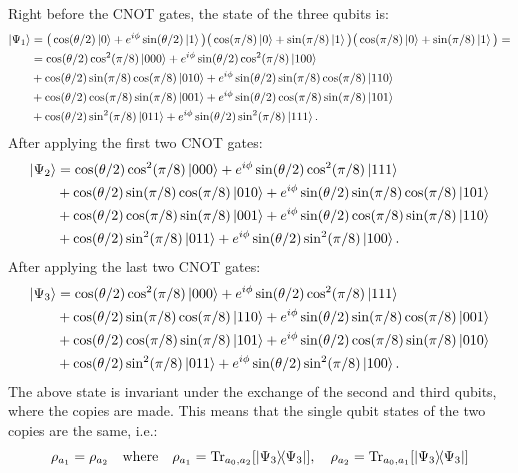 Right before the CNOT gates, the state of the three qubits is:
\[
    \begin{split}
    \ket{\Psi_1}&=\big(\cos(\theta/2)\ket{0}+e^{i\phi}\sin(\theta/2)\ket{1}\big)\big(\cos(\pi/8)\ket{0}+\sin(\pi/8)\ket{1}\big)\big(\cos(\pi/8)\ket{0}+\sin(\pi/8)\ket{1}\big)=\\
    &=\cos(\theta/2)\cos^2(\pi/8)\ket{000}+e^{i\phi}\sin(\theta/2)\cos^2(\pi/8)\ket{100}\\
    &+\cos(\theta/2)\sin(\pi/8)\cos(\pi/8)\ket{010}+e^{i\phi}\sin(\theta/2)\sin(\pi/8)\cos(\pi/8)\ket{110}\\
    &+\cos(\theta/2)\cos(\pi/8)\sin(\pi/8)\ket{001}+e^{i\phi}\sin(\theta/2)\cos(\pi/8)\sin(\pi/8)\ket{101}\\
    &+\cos(\theta/2)\sin^2(\pi/8)\ket{011}+e^{i\phi}\sin(\theta/2)\sin^2(\pi/8)\ket{111}.
    \end{split}
\]
After applying the first two CNOT gates:
\[
    \begin{split}
    \ket{\Psi_2}&=\cos(\theta/2)\cos^2(\pi/8)\ket{000}+e^{i\phi}\sin(\theta/2)\cos^2(\pi/8)\ket{111}\\
    &+\cos(\theta/2)\sin(\pi/8)\cos(\pi/8)\ket{010}+e^{i\phi}\sin(\theta/2)\sin(\pi/8)\cos(\pi/8)\ket{101}\\
    &+\cos(\theta/2)\cos(\pi/8)\sin(\pi/8)\ket{001}+e^{i\phi}\sin(\theta/2)\cos(\pi/8)\sin(\pi/8)\ket{110}\\
    &+\cos(\theta/2)\sin^2(\pi/8)\ket{011}+e^{i\phi}\sin(\theta/2)\sin^2(\pi/8)\ket{100}.
    \end{split}
\]
After applying the last two CNOT gates:
\[
    \begin{split}
    \ket{\Psi_3}&=\cos(\theta/2)\cos^2(\pi/8)\ket{000}+e^{i\phi}\sin(\theta/2)\cos^2(\pi/8)\ket{111}\\
    &+\cos(\theta/2)\sin(\pi/8)\cos(\pi/8)\ket{110}+e^{i\phi}\sin(\theta/2)\sin(\pi/8)\cos(\pi/8)\ket{001}\\
    &+\cos(\theta/2)\cos(\pi/8)\sin(\pi/8)\ket{101}+e^{i\phi}\sin(\theta/2)\cos(\pi/8)\sin(\pi/8)\ket{010}\\
    &+\cos(\theta/2)\sin^2(\pi/8)\ket{011}+e^{i\phi}\sin(\theta/2)\sin^2(\pi/8)\ket{100}.
    \end{split}
\]
The above state is invariant under the exchange of the second and third qubits, where the copies are made. 
This means that the single qubit states of the two copies are the same, i.e.:
\[
    \rho_{a_1}=\rho_{a_2} \quad \text{where} \quad \rho_{a_1}=\Tr_{a_0,a_2}[\ketbra{\Psi_3}], \quad \rho_{a_2}=\Tr_{a_0,a_1}[\ketbra{\Psi_3}]
\]
